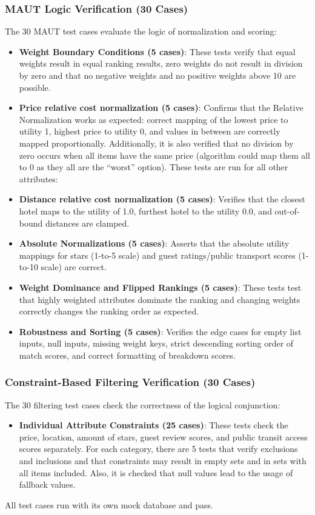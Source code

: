 \documentclass[acmlarge]{acmart}
\begin{document}
\subsubsection{MAUT Logic Verification (30 Cases)}
The 30 MAUT test cases evaluate the logic of normalization and scoring:
\begin{itemize}
  \item \textbf{Weight Boundary Conditions (5 cases)}: These tests verify that equal weights result in equal ranking results, zero weights do not result in division by zero and that no negative weights and no positive weights above 10 are possible.
  \item \textbf{Price relative cost normalization (5 cases)}: Confirms that the Relative Normalization works as expected: correct mapping of the lowest price to utility 1, highest price to utility 0, and values in between are correctly mapped proportionally. Additionally, it is also verified that no division by zero occurs when all items have the same price (algorithm could map them all to 0 as they all are the ``worst'' option). These tests are run for all other attributes:
  \item \textbf{Distance relative cost normalization (5 cases)}: Verifies that the closest hotel maps to the utility of 1.0, furthest hotel to the utility 0.0, and out-of-bound distances are clamped.
  \item \textbf{Absolute Normalizations (5 cases)}: Asserts that the absolute utility mappings for stars (1-to-5 scale) and guest ratings/public transport scores (1-to-10 scale) are correct.
  \item \textbf{Weight Dominance and Flipped Rankings (5 cases)}: These tests test that highly weighted attributes dominate the ranking and changing weights correctly changes the ranking order as expected.
  \item \textbf{Robustness and Sorting (5 cases)}: Verifies the edge cases for empty list inputs, null inputs, missing weight keys, strict descending sorting order of match scores, and correct formatting of breakdown scores.
\end{itemize}

\subsubsection{Constraint-Based Filtering Verification (30 Cases)}
The 30 filtering test cases check the correctness of the logical conjunction:
\begin{itemize}
  \item \textbf{Individual Attribute Constraints (25 cases)}: 
  These tests
   check the price, location, amount of stars, guest review scores, and public transit access scores separately. For each category, there are 5 tests that verify exclusions and inclusions and that constraints may result in empty sets and in sets with all items included. Also, it is checked that null values lead to the usage of fallback values.
\end{itemize}
All test cases run with its own mock database and pass.
\end{document}
